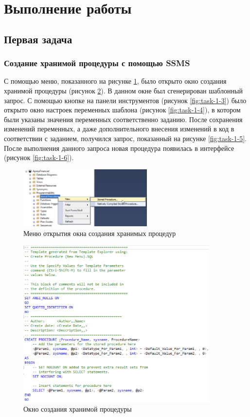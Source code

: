 \documentclass[a4paper, 14pt]{extarticle}
\begin{document}
\section{Выполнение работы}

\subsection{Первая задача}

\subsubsection{Создание хранимой процедуры с помощью SSMS}

С помощью меню, показанного на рисунке \ref{fig:task-1-1}, было открыто окно
создания хранимой процедуры (рисунок \ref{fig:task-1-2}). В данном окне был
сгенерирован шаблонный запрос. С помощью кнопке на панели инструментов (рисунок
\ref{fig:task-1-3}) было открыто окно настроек переменных шаблона (рисунок
\ref{fig:task-1-4}), в котором были указаны значения переменных соответственно
заданию. После сохранения изменений переменных, а даже дополнительного внесения
изменений в код в соответствии с заданием, получился запрос, показанный на
рисунке \ref{fig:task-1-5}. После выполнения данного запроса новая процедура
появилась в интерфейсе (рисунок \ref{fig:task-1-6}).

\begin{figure}[H]
  \centering
  \includegraphics[width=0.6\textwidth]{images/task-1/1.png}
  \caption{Меню открытия окна создания хранимых процедур}
  \label{fig:task-1-1}
\end{figure}

\begin{figure}[H]
  \centering
  \includegraphics[width=0.9\textwidth]{images/task-1/2.png}
  \caption{Окно создания хранимой процедуры}
  \label{fig:task-1-2}
\end{figure}
\end{document}
